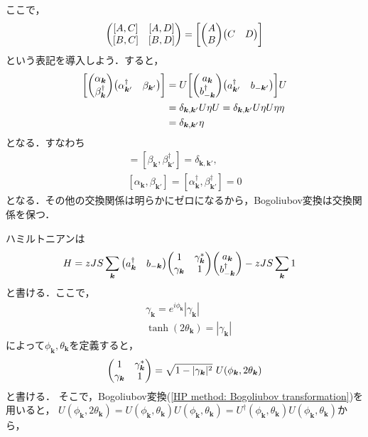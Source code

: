 \documentclass[\main/main.tex]{subfiles}
\begin{document}
\begin{frame}
    ここで，
    \begin{align}
        \mqty(
            [A,C] & [A,D] \\ 
            [B,C] & [B,D]
            )
        = \qty[\mqty(A\\B)\mqty(C&D)]
    \end{align}
    という表記を導入しよう．すると，
    \begin{align}
        \qty[\mqty(\alpha_{\bm{k}}\\ \beta_{\bm{k}}^\dagger)\mqty(\alpha_{\bm{k}'}^\dagger & \beta_{\bm{k}'})]
        &\nonumber
        =
        U\qty[\mqty(a_{\bm{k}}\\ b_{-\bm{k}}^\dagger)\mqty(a_{\bm{k}'}^\dagger & b_{-\bm{k}'})]U
        \\ &\nonumber
        = \delta_{\bm{k},\bm{k}'}U \eta U
        = \delta_{\bm{k},\bm{k}'} U\eta U \eta \eta
        \\ &
        = \delta_{\bm{k},\bm{k}'}\eta
    \end{align}
    となる．すなわち
    \begin{gather}
        [\alpha_{\bm{k}}, \alpha_{\bm{k}'}^\dagger] = [\beta_{\bm{k}}, 
        \beta_{\bm{k}'}^\dagger] = \delta_{\bm{k},\bm{k}'},
        \\
        [\alpha_{\bm{k}},\beta_{\bm{k}'}] = [\alpha_{\bm{k}}^\dagger, \beta_{\bm{k}'}^\dagger] = 0
    \end{gather}
    となる．その他の交換関係は明らかにゼロになるから，\alert{Bogoliubov変換は交換関係を保つ}．
\end{frame}

\begin{frame}{}
    ハミルトニアンは
    \begin{align}
        H
        &
        = zJS \sum_{\bm{k}}\mqty(a_{\bm{k}}^\dagger & b_{-\bm{k}})\mqty(1 & \gamma_{\bm{k}}^* \\ \gamma_{\bm{k}} &1)\mqty(a_{\bm{k}}\\b_{-\bm{k}}^\dagger) - zJS \sum_{\bm{k}} 1
    \end{align}
    と書ける．ここで，
    \begin{align}
        &
        \gamma_{\bm{k}} = e^{i\phi_{\bm{k}}}|\gamma_{\bm{k}}|
        \\ &
        \tanh(2\theta_{\bm{k}}) = |\gamma_{\bm{k}}|
    \end{align}
    によって$\phi_{\bm{k}},\theta_{\bm{k}}$を定義すると，
    \begin{align}
        \mqty(1 & \gamma_{\bm{k}}^* \\ \gamma_{\bm{k}} &1) = \sqrt{1-|\gamma_{\bm{k}}|^2}~U(\phi_{\bm{k}},2\theta_{\bm{k}})
    \end{align}
    と書ける．
    そこで，Bogoliubov変換(\ref{HP method: Bogoliubov transformation})を用いると，
    $
        U(\phi_{\bm{k}},2\theta_{\bm{k}})
        = U(\phi_{\bm{k}},\theta_{\bm{k}})U(\phi_{\bm{k}},\theta_{\bm{k}})
        = U^\dagger(\phi_{\bm{k}},\theta_{\bm{k}}) U(\phi_{\bm{k}},\theta_{\bm{k}})
    $から，
\end{frame}
\end{document}
